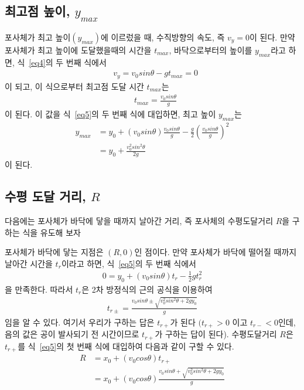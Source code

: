 \documentclass[12pt,a4paper]{article}
\begin{document}
\subsection{최고점 높이, $y_{max}$}
포사체가 최고 높이$(y_{max})$에 이르렀을 때, 수직방향의 속도, 즉 $v_y=0$이 된다. 만약 포사체가 최고 높이에 도달했을때의
시간을 $t_{max}$, 바닥으로부터의 높이를 $y_{max}$라고 하면, 식~\ref{eq4}의 두 번째 식에서
\begin{equation}
    \begin{aligned}
        & v_y=v_0 sin\theta - gt_{max} = 0
    \end{aligned}
\end{equation}
이 되고, 이 식으로부터 최고점 도달 시간 $t_{max}$는
\begin{equation}
    \begin{aligned}
        & t_{max}=\frac{v_0 sin\theta}{g}
    \end{aligned}
\end{equation}
이 된다. 이 값을 식~\ref{eq5}의 두 번째 식에 대입하면, 최고 높이 $y_{max}$는
\begin{equation}
    \begin{aligned}
        y_{max} &= y_0+(v_0 sin\theta)\frac{v_0 sin\theta}{g} - \frac{g}{2}\left(\frac{v_0 sin\theta}{g}\right)^2 \\
        &= y_0+\frac{v_0^2 sin^2\theta}{2g}
    \end{aligned}
\end{equation}
이 된다.
\subsection{수평 도달 거리, $R$}
다음에는 포사체가 바닥에 닿을 때까지 날아간 거리, 즉 포사체의 수평도달거리 $R$을 구하는 식을 유도해 보자

포사체가 바닥에 닿는 지점은 $(R, 0)$인 점이다. 만약 포사체가 바닥에 떨어질 때까지 날아간 시간을 $t_r$이라고 하면,
식~\ref{eq5}의 두 번째 식에서
\begin{equation}
    \begin{aligned}
        0=y_0+(v_0 sin\theta)t_r-\frac{1}{2}gt_r^2
    \end{aligned}
\end{equation}
을 만족한다. 따라서 $t_r$은 2차 방정식의 근의 공식을 이용하여
\begin{equation}
    \begin{aligned}
        t_{r\pm}=\frac{v_0 sin\theta\pm\sqrt{v_0^2 sin^2\theta+2gy_0}}{g}
        \label{eq10}
    \end{aligned}
\end{equation}
임을 알 수 있다. 여기서 우리가 구하는 답은 $t_{r+}$가 된다 $(t_{r+} > 0$ 이고 $t_{r-} < 0$인데, 음의 값은 공이 발사되기
 전 시간이므로 $t_{r+}$가 구하는 답이 된다). 수평도달거리 $R$은 $t_{r+}$를 식~\ref{eq5}의 첫 번째 
 식에 대입하여 다음과 같이 구할 수 있다.
 \begin{equation}
    \begin{aligned}
        R&=x_0+(v_0 cos\theta)t_{r+} \\
        &=x_0+(v_0 cos\theta)\frac{v_0 sin\theta+\sqrt{v_0^2 sin^2\theta+2gy_0}}{g}
        \label{eq11}
    \end{aligned}
\end{equation}
\end{document}
